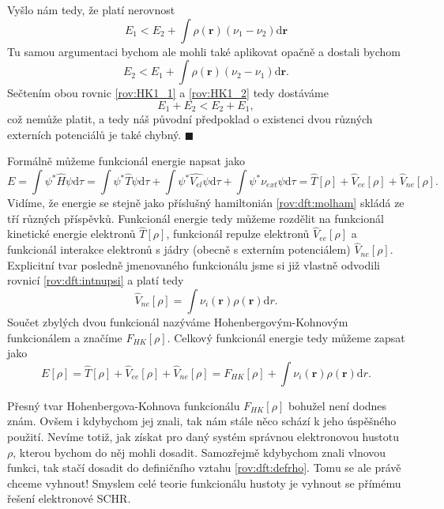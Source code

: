 \noindent Vyšlo nám tedy, že platí nerovnost
\begin{equation}
E_1 < E_2+\int \rho(\mathbf{r})(\nu_1-\nu_2)\mathrm{d}\mathbf{r}
\label{rov:HK1_1}
\end{equation}
Tu samou argumentaci bychom ale mohli také aplikovat opačně a dostali bychom
\begin{equation}
E_2 < E_1+\int \rho(\mathbf{r})(\nu_2-\nu_1)\mathrm{d}\mathbf{r} .
\label{rov:HK1_2}
\end{equation}
Sečtením obou rovnic \eqref{rov:HK1_1} a \eqref{rov:HK1_2} tedy dostáváme
\begin{equation}
E_1 + E_2 < E_2 + E_1 ,
\end{equation}
což nemůže platit, a tedy náš původní předpoklad o existenci dvou různých externích potenciálů je také chybný.
\hfill {\footnotesize $\blacksquare$}

\bigskip
Formálně můžeme funkcionál energie napsat jako
\begin{equation}
E=\int \psi^*\hat{H}\psi \mathrm{d}\tau = \int \psi^*\hat{T}\psi\mathrm{d}\tau + \int \psi^*\hat{V_{el}}\psi\mathrm{d}\tau + \int \psi^*\nu_{ext}\psi\mathrm{d}\tau=\hat{T}[\rho]+\hat{V}_{ee}[\rho]+\hat{V}_{ne}[\rho] .
\end{equation}
Vidíme, že energie se stejně jako příslušný hamiltonián \eqref{rov:dft:molham} skládá ze tří různých příspěvků. Funkcionál energie tedy můžeme rozdělit na funkcionál kinetické energie elektronů $\hat{T}[\rho]$, funkcionál repulze elektronů $\hat{V}_{ee}[\rho]$ a funkcionál interakce elektronů s jádry (obecně s externím potenciálem) $\hat{V}_{ne}[\rho]$. 
Explicitní tvar posledně jmenovaného funkcionálu jsme si již vlastně odvodili rovnicí \eqref{rov:dft:intnupsi} a platí tedy
\begin{equation}
\hat{V}_{ne}[\rho] = \int \nu_i(\textbf{r})\rho(\textbf{r}) \mathrm{d}r .
\end{equation}
Součet zbylých dvou funkcionál nazýváme Hohenbergovým-Kohnovým funkcionálem a značíme $F_{HK}[\rho]$. 
Celkový funkcionál energie tedy můžeme zapsat jako
\begin{equation}
E[\rho] = \hat{T}[\rho]+\hat{V}_{ee}[\rho]+\hat{V}_{ne}[\rho] = F_{HK}[\rho] + \int \nu_i(\textbf{r})\rho(\textbf{r}) \mathrm{d}r .
\end{equation}

Přesný tvar Hohenbergova-Kohnova funkcionálu $F_{HK}[\rho]$ bohužel není dodnes znám. 
Ovšem i kdybychom jej znali, tak nám stále něco schází k jeho úspěšného použití. Nevíme totiž, jak získat pro daný systém správnou elektronovou hustotu $\rho$, kterou bychom do něj mohli dosadit. Samozřejmě kdybychom znali vlnovou funkci, tak stačí dosadit do definičního vztahu \eqref{rov:dft:defrho}. Tomu se ale právě chceme vyhnout! Smyslem celé teorie funkcionálu hustoty je vyhnout se přímému řešení elektronové SCHR.


